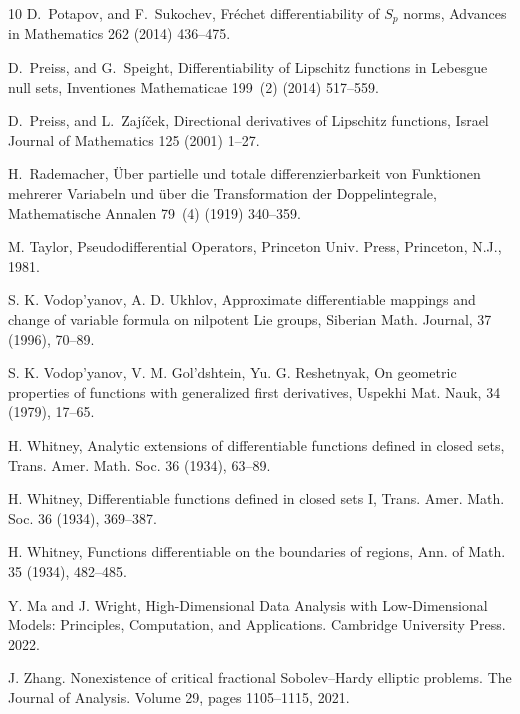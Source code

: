 \documentclass[a4paper,12pt,reqno]{amsart}%
\theoremstyle{definition}
\numberwithin{equation}{section}
\numberwithin{theorem}{section}
\begin{document}
\begin{thebibliography}{10}
D.~Potapov, and F.~Sukochev, {Fr{\'{e}}chet differentiability of $S_p$ norms},
  Advances in Mathematics 262 (2014) 436--475.

D.~Preiss, and G.~Speight, {Differentiability of Lipschitz functions in
  Lebesgue null sets}, Inventiones Mathematicae 199~(2) (2014) 517--559.

D.~Preiss, and L.~Zaj{\'{i}}{\v{c}}ek, {Directional derivatives of Lipschitz
  functions}, Israel Journal of Mathematics 125 (2001) 1--27.

H.~Rademacher, {{\"{U}}ber partielle und totale differenzierbarkeit von
  Funktionen mehrerer Variabeln und {\"{u}}ber die Transformation der
  Doppelintegrale}, Mathematische Annalen 79~(4) (1919) 340--359.

 M.   Taylor,  Pseudodifferential Operators, Princeton Univ. Press, Princeton, N.J., 1981.

 S. K. Vodop’yanov, A. D. Ukhlov, Approximate differentiable mappings and change of variable formula on nilpotent Lie groups, Siberian Math. Journal, 37 (1996), 70–89.

 S. K. Vodop’yanov, V. M. Gol’dshtein, Yu. G. Reshetnyak, On geometric properties of functions with generalized first derivatives, Uspekhi Mat. Nauk, 34 (1979), 17–65.


 H. Whitney, Analytic extensions of differentiable functions defined in closed sets, Trans.
Amer. Math. Soc. 36 (1934), 63–89.

 H. Whitney, Differentiable functions defined in closed sets I, Trans. Amer. Math. Soc. 36
(1934), 369–387.

 H. Whitney, Functions differentiable on the boundaries of regions, Ann. of Math. 35 (1934),
482–485.

 Y. Ma and J. Wright, High-Dimensional Data Analysis with Low-Dimensional Models: Principles, Computation, and Applications. Cambridge University Press. 2022. 

 J. Zhang. Nonexistence of critical fractional Sobolev–Hardy elliptic problems. The Journal of Analysis. Volume 29, pages 1105–1115, 2021.

\end{thebibliography}
\end{document}
